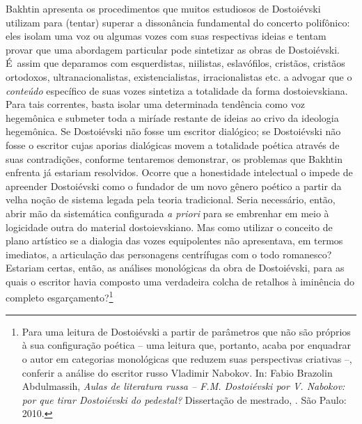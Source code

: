 {Bakhtin apresenta os procedimentos que muitos estudiosos de Dostoiévski
utilizam para (tentar) superar a dissonância fundamental do concerto
polifônico: eles isolam uma voz ou algumas vozes com suas respectivas
ideias e tentam provar que uma abordagem particular pode sintetizar as
obras de Dostoiévski. É~assim que deparamos com esquerdistas, niilistas,
eslavófilos, cristãos, cristãos ortodoxos, ultranacionalistas,
existencialistas, irracionalistas etc. a advogar que o \emph{conteúdo}
específico de suas vozes sintetiza a totalidade da forma dostoievskiana.
Para tais correntes, basta isolar uma determinada tendência como voz
hegemônica e submeter toda a miríade restante de ideias ao crivo da
ideologia hegemônica. Se Dostoiévski não fosse um escritor dialógico; se
Dostoiévski não fosse o escritor cujas aporias dialógicas movem a
totalidade poética através de suas contradições, conforme tentaremos
demonstrar, os problemas que Bakhtin enfrenta já estariam resolvidos.
Ocorre que a honestidade intelectual o impede de apreender Dostoiévski
como o fundador de um novo gênero poético a partir da velha noção de
sistema legada pela teoria tradicional. Seria necessário, então, abrir
mão da sistemática configurada \emph{a priori} para se embrenhar em meio
à logicidade outra do material dostoievskiano. Mas como utilizar o
conceito de plano artístico se a dialogia das vozes equipolentes não
apresentava, em termos imediatos, a articulação das personagens
centrífugas com o todo romanesco? Estariam certas, então, as análises
monológicas da obra de Dostoiévski, para as quais o escritor havia
composto uma verdadeira colcha de retalhos à iminência do completo
esgarçamento?\footnote{Para uma leitura de Dostoiévski a partir de
  parâmetros que não são próprios à sua configuração poética -- uma
  leitura que, portanto, acaba por enquadrar o autor em categorias
  monológicas que reduzem suas perspectivas criativas --, conferir a
  análise do escritor russo Vladimir Nabokov. In: Fabio Brazolin
  Abdulmassih, \emph{Aulas de literatura russa -- F.M. Dostoiévski por
  V. Nabokov: por que tirar Dostoiévski do pedestal?} Dissertação de
  mestrado, . São Paulo: 2010.}

}

